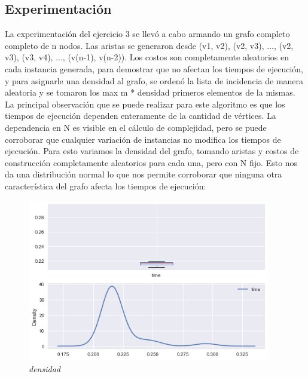 \subsection{Experimentación}
La experimentación del ejercicio 3 se llevó a cabo armando un grafo completo completo de n nodos. Las aristas se generaron desde (v1, v2), (v2, v3), ..., (v2, v3), (v3, v4), ..., (v(n-1), v(n-2)). Los costos son completamente aleatorios en cada instancia generada, para demostrar que no afectan los tiempos de ejecución, y para asignarle una densidad al grafo, se ordenó la lista de incidencia de manera aleatoria y se tomaron los max m * densidad primeros elementos de la mismas.\\
 
La principal observación que se puede realizar para este algoritmo es que los tiempos de ejecución dependen enteramente de la cantidad de vértices. La dependencia en N es visible en el cálculo de complejidad, pero se puede corroborar que cualquier variación de instancias no modifica los tiempos de ejecución. Para esto variamos la densidad del grafo, tomando aristas y costos de construcción completamente aleatorios para cada una, pero con N fijo. Esto nos da una distribución normal lo que nos permite corroborar que ninguna otra característica del grafo afecta los tiempos de ejecución:\\


\begin{figure}[!htb!]
	\begin{center}
		\includegraphics[width=300pt]{Imagenes/density.png}
		\caption{{\small \textit{densidad}}}
	\end{center}
\end{figure}


